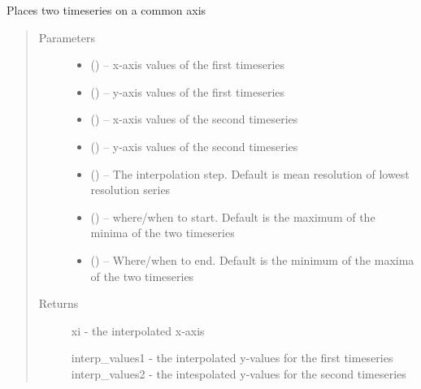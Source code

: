 \documentclass[letterpaper,10pt,english]{sphinxmanual}
\begin{document}
\begin{fulllineitems}
\label{\detokenize{Timeseries:pyleoclim.Timeseries.onCommonAxis}}
Places two timeseries on a common axis
\begin{quote}\begin{description}
\item[{Parameters}] \leavevmode\begin{itemize}
\item {} 
 () -- x-axis values of the first timeseries

\item {} 
 () -- y-axis values of the first timeseries

\item {} 
 () -- x-axis values of the second timeseries

\item {} 
 () -- y-axis values of the second timeseries

\item {} 
 () -- The interpolation step. Default is mean resolution
of lowest resolution series

\item {} 
 () -- where/when to start. Default is the maximum of the minima of
the two timeseries

\item {} 
 () -- Where/when to end. Default is the minimum of the maxima of
the two timeseries

\end{itemize}

\item[{Returns}] \leavevmode

xi -  the interpolated x-axis

interp\_values1 -  the interpolated y-values for the first timeseries
interp\_values2 - the intespolated y-values for the second timeseries


\end{description}\end{quote}

\end{fulllineitems}
\end{document}

